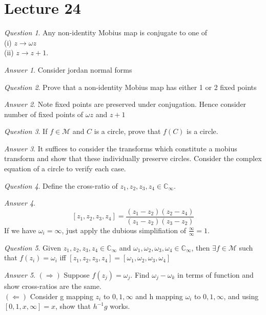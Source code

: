 \documentclass[]{article}
\def\complex{\mathbb{C}}
\def\mobius{\mathcal{M}}
\theoremstyle{remark}
\theoremstyle{qnstyle}
\newtheorem{question}{Question}
\theoremstyle{answerstyle}
\newtheorem*{answer}{Answer}
\begin{document}
\section* {Lecture 24}


\begin{question}
    Any non-identity Mobius map is conjugate to one of \\
    (i) $z \to \omega z$ \\
    (ii) $z \to z + 1$.
\end{question}
\begin{answer}
    Consider jordan normal forms
\end{answer}

\begin{question}
    Prove that a non-identity Mobius map has either 1 or 2 fixed points 
\end{question}
\begin{answer}
    Note fixed points are preserved under conjugation. Hence consider number of
    fixed points of $\omega z$ and $z + 1$
\end{answer}

\begin{question}
    If $f \in \mobius$ and $C$ is a circle, prove that $f(C)$ is a circle.
\end{question}
\begin{answer}
    It suffices to consider the transforms which constitute a mobius transform
    and show that these individually preserve circles. Consider the complex equation
    of a circle to verify each case.
\end{answer}

\begin{question}
    Define the cross-ratio of $z_1, z_2, z_3, z_4 \in \complex_\infty$.
\end{question}
\begin{answer}
        $$[z_1, z_2, z_3, z_4] = \frac{(z_1 - z_2)(z_2 - z_4)}{(z_1 - z_2)(z_3 - z_2)}$$
    If we have $\omega_i = \infty$, just apply the dubious simplifiation of $\frac{\infty}{\infty} = 1$.
\end{answer}

\begin{question}
    Given $z_1, z_2, z_3, z_4 \in \complex_\infty$
    and $\omega_1, \omega_2, \omega_3, \omega_4 \in \complex_\infty$,
    then $\exists f \in \mobius$ such that $f(z_i) = \omega_i$ iff 
    $[z_1, z_2, z_3, z_4] = [\omega_1, \omega_2, \omega_3, \omega_4]$
\end{question}
\begin{answer}
    $(\Rightarrow)$ Suppose $f(z_j) = \omega_j$. Find $\omega_j - \omega_k$ in terms of
    function and show cross-ratios are the same. \\

    $(\Leftarrow)$ Consider g mapping $z_i$ to $0,1,\infty$ and h mapping $\omega_i$ 
    to $0,1,\infty$, and using $[0,1,x,\infty] = x$, show that $h^{-1}g$ works.
\end{answer}
\end{document}
